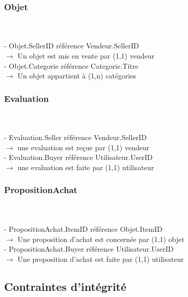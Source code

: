 \documentclass[a4paper,11pt]{article}
\begin{document}
\subsubsection{Objet}
\\ \\
\indent - Objet.SellerID référence Vendeur.SellerID \\
\indent \indent $\rightarrow$ Un objet est mis en vente par (1,1) vendeur\\
\indent - Objet.Categorie référence Categorie.Titre \\
\indent \indent $\rightarrow$ Un objet appartient à (1,n) catégories


\subsubsection{Evaluation}
\\ \\
\indent - Evaluation.Seller référence Vendeur.SellerID\\
\indent \indent $\rightarrow$ une evaluation est reçue par (1,1) vendeur\\
\indent - Evaluation.Buyer référence Utilisateur.UserID\\
\indent \indent $\rightarrow$ une evaluation est faite par (1,1) utilisateur


\subsubsection{PropositionAchat}
\\ \\
\indent - PropositionAchat.ItemID référence Objet.ItemID \\
\indent \indent $\rightarrow$ Une proposition d'achat est concernée par (1,1) objet\\
\indent - PropositionAchat.Buyer référence Utilisateur.UserID \\
\indent \indent $\rightarrow$ Une proposition d'achat est faite par (1,1) utilisateur



\subsection{Contraintes d'intégrité}
\end{document}
